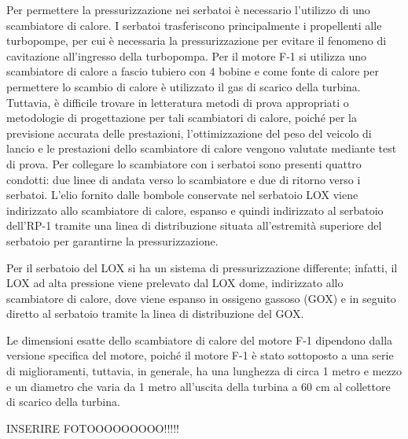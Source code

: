 Per permettere la pressurizzazione nei serbatoi è necessario l’utilizzo di uno scambiatore di calore.
I serbatoi trasferiscono principalmente i propellenti alle turbopompe, per cui è necessaria la pressurizzazione per evitare il fenomeno di cavitazione all'ingresso della turbopompa. 
Per il motore F-1 si utilizza uno scambiatore di calore a fascio tubiero con 4 bobine e come fonte di calore per permettere lo scambio di calore è utilizzato il gas di scarico della turbina.
Tuttavia, è difficile trovare in letteratura metodi di prova appropriati o metodologie di progettazione per tali scambiatori di calore, poiché per la previsione accurata delle prestazioni, l'ottimizzazione del peso del veicolo di lancio e le prestazioni dello scambiatore di calore vengono valutate mediante test di prova. 
Per collegare lo scambiatore con i serbatoi sono presenti quattro condotti: due linee di andata verso lo scambiatore e due di ritorno verso i serbatoi.
L'elio fornito dalle bombole conservate nel serbatoio LOX viene indirizzato allo scambiatore di calore, espanso e quindi indirizzato al serbatoio dell’RP-1 tramite una linea di distribuzione situata all'estremità superiore del serbatoio per garantirne la pressurizzazione. 

Per il serbatoio del LOX si ha un sistema di pressurizzazione differente; infatti, il LOX ad alta pressione viene prelevato dal LOX dome, indirizzato allo scambiatore di calore, dove viene espanso in ossigeno gassoso (GOX) e in seguito diretto al serbatoio tramite la linea di distribuzione del GOX.

Le dimensioni esatte dello scambiatore di calore del motore F-1 dipendono dalla versione specifica del motore, poiché il motore F-1 è stato sottoposto a una serie di miglioramenti, tuttavia, in generale, ha una lunghezza di circa 1 metro e mezzo e un diametro che varia da 1 metro all'uscita della turbina a 60 cm al collettore di scarico della turbina. 

INSERIRE FOTOOOOOOOOO!!!!!




